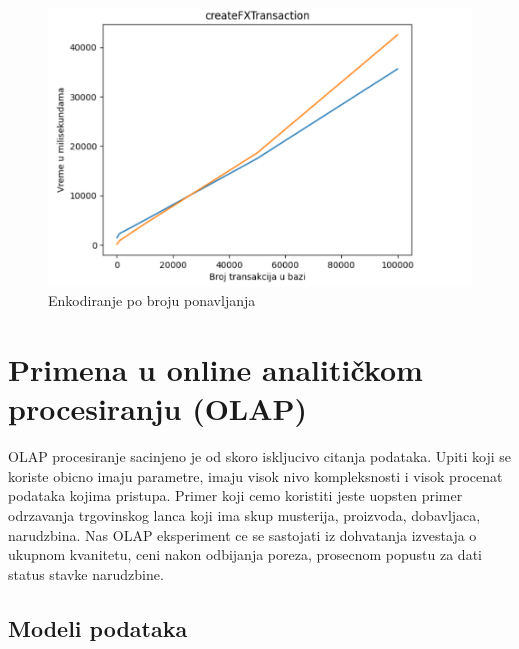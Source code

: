 \documentclass[12pt,oneside]{memoir}
\begin{document}
\begin{figure}[!ht]
  \centering
  \includegraphics[width=1\textwidth]{createFxTransaction-vizualization.png}
  \caption{Enkodiranje po broju ponavljanja}
  \label{fig:grafikon}
\end{figure}

\pagebreak

\section{Primena u online analitičkom procesiranju (OLAP)}

OLAP procesiranje sacinjeno je od skoro iskljucivo citanja podataka. Upiti koji se koriste obicno imaju parametre, imaju visok nivo kompleksnosti i visok procenat podataka kojima pristupa.
Primer koji cemo koristiti jeste uopsten primer odrzavanja trgovinskog lanca koji ima skup musterija, proizvoda, dobavljaca,  narudzbina. 
Nas OLAP eksperiment ce se sastojati iz dohvatanja izvestaja o ukupnom kvanitetu, ceni nakon odbijanja poreza, prosecnom popustu za dati status stavke narudzbine.

\subsection{Modeli podataka}


\end{document}
